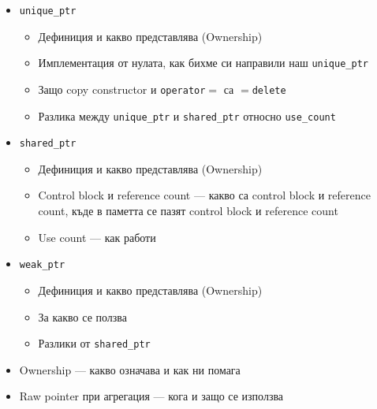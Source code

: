 \documentclass[a4paper,11pt]{article}
\newcommand{\qtag}[1]{\texttt{\color{greenaccent}\small#1}}
\begin{document}
\begin{tcolorbox}[categorybox, title={6.\ Умни указатели (Smart Pointers)}]
\begin{itemize}
  \item \qtag{unique\_ptr}
    \begin{itemize}
    \item Дефиниция и какво представлява (Ownership)
      \item Имплементация от нулата, как бихме си направили наш \qtag{unique\_ptr}
      \item Защо copy constructor и \qtag{operator$=$} са \qtag{$=$delete}
      \item Разлика между \qtag{unique\_ptr} и \qtag{shared\_ptr} относно \qtag{use\_count}
    \end{itemize}
  \item \qtag{shared\_ptr}
    \begin{itemize}
     \item Дефиниция и какво представлява (Ownership)
      \item Control block и reference count — какво са control block и reference count, къде в паметта се пазят control block и reference count
      \item Use count — как работи
    \end{itemize}
  \item \qtag{weak\_ptr}
    \begin{itemize}
    \item Дефиниция и какво представлява (Ownership)
      \item За какво се ползва
      \item Разлики от \qtag{shared\_ptr}
    \end{itemize}
  \item Ownership — какво означава и как ни помага
  \item Raw pointer при агрегация — кога и защо се използва
\end{itemize}
\end{tcolorbox}
\end{document}
